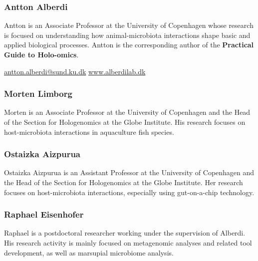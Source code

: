 \documentclass[
]{book}
\begin{document}
\hypertarget{antton-alberdi}{%
\subsubsection*{Antton Alberdi}\label{antton-alberdi}}

Antton is an Associate Professor at the University of Copenhagen whose research is focused on understanding how animal-microbiota interactions shape basic and applied biological processes. Antton is the corresponding author of the \textbf{Practical Guide to Holo-omics}.

\url{antton.alberdi@sund.ku.dk} \textbar{} \url{www.alberdilab.dk}

\hypertarget{morten-limborg}{%
\subsubsection*{Morten Limborg}\label{morten-limborg}}

Morten is an Associate Professor at the University of Copenhagen and the Head of the Section for Hologenomics at the Globe Institute. His research focuses on host-microbiota interactions in aquaculture fish species.

\hypertarget{ostaizka-aizpurua}{%
\subsubsection*{Ostaizka Aizpurua}\label{ostaizka-aizpurua}}

Ostaizka Aizpurua is an Assistant Professor at the University of Copenhagen and the Head of the Section for Hologenomics at the Globe Institute. Her research focuses on host-microbiota interactions, especially using gut-on-a-chip technology.

\hypertarget{raphael-eisenhofer}{%
\subsubsection*{Raphael Eisenhofer}\label{raphael-eisenhofer}}

Raphael is a postdoctoral researcher working under the supervision of Alberdi. His research activity is mainly focused on metagenomic analyses and related tool development, as well as marsupial microbiome analysis.
\end{document}
